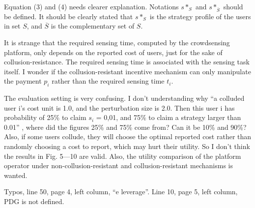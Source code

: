 \documentclass[a4paper,11pt]{exam}
\begin{document}
\begin{questions}
\question Equation (3) and (4) needs clearer explanation. Notations $s*_S$ and $s*_{\overline{S}}$ should be defined. It should be clearly stated that $s*_S$ is the strategy profile of the users in set $S$, and $\overline{S}$ is the complementary set of $S$. 

\question It is strange that the required sensing time, computed by the crowdsensing platform, only depends on the reported cost of users, just for the sake of collusion-resistance. The required sensing time is associated with the sensing task itself. I wonder if the collusion-resistant incentive mechanism can only manipulate the payment $p_i$ rather than the required sensing time $t_i$. 

\question The evaluation setting is very confusing. I don’t understanding why “a colluded user i’s cost unit is 1.0, and the perturbation size is 2.0. Then this user i has probability of 25\% to claim $s_i$ = 0,01, and 75\% to claim a strategy larger than 0.01” , where did the figures 25\% and 75\% come from? Can it be 10\% and 90\%? Also, if some users collude, they will choose the optimal reported cost rather than randomly choosing a cost to report, which may hurt their utility.  So I don’t think the results in Fig. 5---10 are valid. Also, the utility comparison of the platform operator under non-collusion-resistant and collusion-resistant mechanisms is wanted. 

\question Typos, line 50, page 4, left column, “e leverage”. Line 10, page 5, left column, PDG is not defined.
\end{questions}
\end{document}
